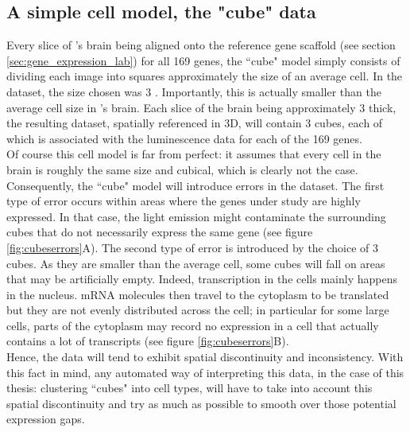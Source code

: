   \subsection{A simple cell model, the "cube" data}
  
  Every slice of \platy{}'s brain being aligned onto the reference gene scaffold (see section \ref{sec:gene_expression_lab}) for all 169 genes, the ``cube" model simply consists of dividing each image into squares approximately the size of an average cell. In the \platy{} dataset, the size chosen was 3  \cite{Fischer10}. Importantly, this is actually smaller than the average cell size in \platy{}'s brain. Each slice of the brain being approximately 3 \microm{} thick, the resulting dataset, spatially referenced in 3D, will contain 3  cubes, each of which is associated with the luminescence data for each of the 169 genes.\\
  
  Of course this cell model is far from perfect: it assumes that every cell in the brain is roughly the same size and cubical, which is clearly not the case. Consequently, the ``cube" model will introduce errors in the dataset. The first type of error occurs within areas where the genes under study are highly expressed. In that case, the light emission might contaminate the surrounding cubes that do not necessarily express the same gene (see figure \ref{fig:cubeserrors}A). The second type of error is introduced by the choice of 3  cubes. As they are smaller than the average cell, some cubes will fall on areas that may be artificially empty. Indeed, transcription in the cells mainly happens in the nucleus. mRNA molecules then travel to the cytoplasm to be translated but they are not evenly distributed across the cell; in particular for some large cells, parts of the cytoplasm may record no expression in a cell that actually contains a lot of transcripts (see figure \ref{fig:cubeserrors}B).\\
  
  Hence, the data will tend to exhibit spatial discontinuity and inconsistency. With this fact in mind, any automated way of interpreting this data, in the case of this thesis: clustering ``cubes" into cell types, will have to take into account this spatial discontinuity and try as much as possible to smooth over those potential expression gaps.\\
  
